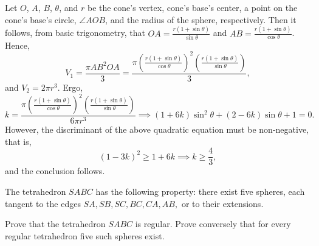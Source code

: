 \documentclass[12pt,a4paper]{memoir}
\theoremstyle{definition}
\begin{document}
\begin{solution}[name={Solution by Boxedexe}]
	Let $ O$, $ A$, $ B$, $ \theta$, and $ r$ be the cone's vertex, cone's base's center, a point on the cone's base's circle, $ \angle AOB$, and the radius of the sphere, respectively. Then it follows, from basic trigonometry, that $ OA = \frac {r(1 + \sin\theta)}{\sin\theta}$ and $ AB = \frac {r(1 + \sin\theta)}{\cos\theta}$. Hence, $$ V_1 = \frac {\pi AB^2OA}{3} = \frac {\pi\left(\frac {r(1 + \sin\theta)}{\cos\theta}\right)^2\left(\frac {r(1 + \sin\theta)}{\sin\theta}\right)}{3},$$ and $ V_2 = 2\pi r^3$. Ergo,
	\[ k = \frac {\pi\left(\frac {r(1 + \sin\theta)}{\cos\theta}\right)^2\left(\frac {r(1 + \sin\theta)}{\sin\theta}\right)}{6\pi r^3}\implies (1 + 6k)\sin^2\theta + (2 - 6k)\sin\theta + 1 = 0.
	\]
	However, the discriminant of the above quadratic equation must be non-negative, that is, $$ (1 - 3k)^2\geq 1 + 6k\implies k\geq\frac {4}{3},$$
	and the conclusion follows.
\end{solution}




\begin{question}[name={1962 International Mathematical Olympiad}]
	The tetrahedron $SABC$ has the following property: there exist five spheres, each tangent to the edges $SA, SB, SC, BC, CA, AB,$ or to their extensions.
	\begin{tasks}
		\task Prove that the tetrahedron $SABC$ is regular.
		\task Prove conversely that for every regular tetrahedron five such spheres exist.
	\end{tasks}
\end{question}
\end{document}
